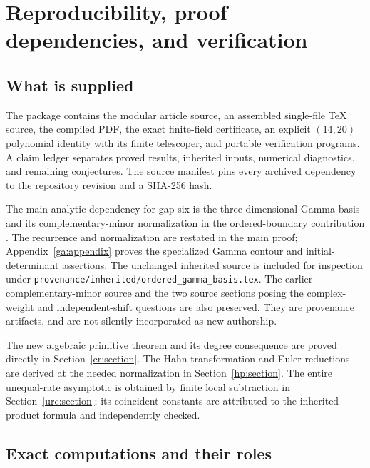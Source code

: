 \section{Reproducibility, proof dependencies, and verification}
\label{repro:section}

\subsection{What is supplied}

The package contains the modular article source, an assembled
single-file \TeX{} source, the compiled PDF, the exact
finite-field certificate, an explicit $(14,20)$ polynomial
identity with its finite telescoper, and portable verification
programs. A claim ledger separates proved results, inherited
inputs, numerical diagnostics, and remaining conjectures.
The source manifest pins every archived dependency to the
repository revision and a SHA-256 hash.

The main analytic dependency for gap six is the three-dimensional
Gamma basis and its complementary-minor normalization in the
ordered-boundary contribution \cite{OrderedIncoming}.
The recurrence and normalization are restated in the main proof;
Appendix~\ref{ga:appendix} proves the specialized Gamma contour
and initial-determinant assertions. The unchanged inherited source
is included for inspection under
\texttt{provenance/inherited/ordered\_gamma\_basis.tex}.
The earlier complementary-minor source
\cite{GapFourSource} and the two source sections posing the
complex-weight and independent-shift questions are also preserved.
They are provenance artifacts, and are not silently incorporated
as new authorship.

The new algebraic primitive theorem and its degree consequence
are proved directly in Section~\ref{cr:section}. The Hahn
transformation and Euler reductions are derived at the needed
normalization in Section~\ref{hp:section}. The entire unequal-rate
asymptotic is obtained by finite local subtraction in
Section~\ref{urc:section}; its coincident constants are attributed
to the inherited product formula and independently checked.

\subsection{Exact computations and their roles}

